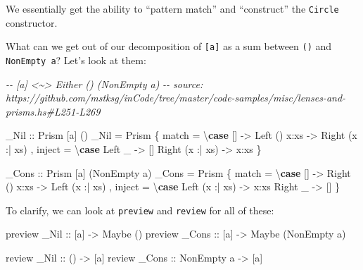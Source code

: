\documentclass[]{article}
\newenvironment{Shaded}{}{}
\newcommand{\CommentTok}[1]{\textcolor[rgb]{0.38,0.63,0.69}{\textit{#1}}}
\newcommand{\DataTypeTok}[1]{\textcolor[rgb]{0.56,0.13,0.00}{#1}}
\newcommand{\KeywordTok}[1]{\textcolor[rgb]{0.00,0.44,0.13}{\textbf{#1}}}
\newcommand{\NormalTok}[1]{#1}
\newcommand{\OperatorTok}[1]{\textcolor[rgb]{0.40,0.40,0.40}{#1}}
\newcommand{\OtherTok}[1]{\textcolor[rgb]{0.00,0.44,0.13}{#1}}
\begin{document}
We essentially get the ability to ``pattern match'' and ``construct'' the
\texttt{Circle} constructor.

What can we get out of our decomposition of \texttt{{[}a{]}} as a sum between
\texttt{()} and \texttt{NonEmpty\ a}? Let's look at them:

\begin{Shaded}
\begin{Highlighting}[]
\CommentTok{{-}{-} [a] <\textasciitilde{}> Either () (NonEmpty a)}
\CommentTok{{-}{-} source: https://github.com/mstksg/inCode/tree/master/code{-}samples/misc/lenses{-}and{-}prisms.hs\#L251{-}L269}

\OtherTok{\_Nil ::} \DataTypeTok{Prism\textquotesingle{}}\NormalTok{ [a] ()}
\NormalTok{\_Nil }\OtherTok{=} \DataTypeTok{Prism\textquotesingle{}}
\NormalTok{    \{ match  }\OtherTok{=}\NormalTok{ \textbackslash{}}\KeywordTok{case}
\NormalTok{        []              }\OtherTok{{-}>} \DataTypeTok{Left}\NormalTok{ ()}
\NormalTok{        x}\OperatorTok{:}\NormalTok{xs            }\OtherTok{{-}>} \DataTypeTok{Right}\NormalTok{ (x }\OperatorTok{:|}\NormalTok{ xs)}
\NormalTok{    , inject }\OtherTok{=}\NormalTok{ \textbackslash{}}\KeywordTok{case}
        \DataTypeTok{Left}\NormalTok{ \_          }\OtherTok{{-}>}\NormalTok{ []}
        \DataTypeTok{Right}\NormalTok{ (x }\OperatorTok{:|}\NormalTok{ xs) }\OtherTok{{-}>}\NormalTok{ x}\OperatorTok{:}\NormalTok{xs}
\NormalTok{    \}}

\OtherTok{\_Cons ::} \DataTypeTok{Prism\textquotesingle{}}\NormalTok{ [a] (}\DataTypeTok{NonEmpty}\NormalTok{ a)}
\NormalTok{\_Cons }\OtherTok{=} \DataTypeTok{Prism\textquotesingle{}}
\NormalTok{    \{ match  }\OtherTok{=}\NormalTok{ \textbackslash{}}\KeywordTok{case}
\NormalTok{        []              }\OtherTok{{-}>} \DataTypeTok{Right}\NormalTok{ ()}
\NormalTok{        x}\OperatorTok{:}\NormalTok{xs            }\OtherTok{{-}>} \DataTypeTok{Left}\NormalTok{ (x }\OperatorTok{:|}\NormalTok{ xs)}
\NormalTok{    , inject }\OtherTok{=}\NormalTok{ \textbackslash{}}\KeywordTok{case}
        \DataTypeTok{Left}\NormalTok{  (x }\OperatorTok{:|}\NormalTok{ xs) }\OtherTok{{-}>}\NormalTok{ x}\OperatorTok{:}\NormalTok{xs}
        \DataTypeTok{Right}\NormalTok{ \_         }\OtherTok{{-}>}\NormalTok{ []}
\NormalTok{    \}}
\end{Highlighting}
\end{Shaded}

To clarify, we can look at \texttt{preview} and \texttt{review} for all of
these:

\begin{Shaded}
\begin{Highlighting}[]
\NormalTok{preview}\OtherTok{ \_Nil  ::}\NormalTok{ [a] }\OtherTok{{-}>} \DataTypeTok{Maybe}\NormalTok{ ()}
\NormalTok{preview}\OtherTok{ \_Cons ::}\NormalTok{ [a] }\OtherTok{{-}>} \DataTypeTok{Maybe}\NormalTok{ (}\DataTypeTok{NonEmpty}\NormalTok{ a)}

\NormalTok{review}\OtherTok{  \_Nil  ::}\NormalTok{ ()         }\OtherTok{{-}>}\NormalTok{ [a]}
\NormalTok{review}\OtherTok{  \_Cons ::} \DataTypeTok{NonEmpty}\NormalTok{ a }\OtherTok{{-}>}\NormalTok{ [a]}
\end{Highlighting}
\end{Shaded}
\end{document}
